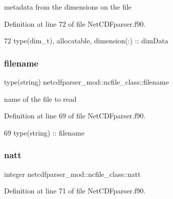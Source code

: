 metadata from the dimensions on the file 



Definition at line 72 of file Net\+C\+D\+Fparser.\+f90.


\begin{DoxyCode}
72         \textcolor{keywordtype}{type}(dim\_t), \textcolor{keywordtype}{allocatable}, \textcolor{keywordtype}{dimension(:)} :: dimData
\end{DoxyCode}
\mbox{\label{structnetcdfparser__mod_1_1ncfile__class_ae3784734e7d33f1c44284a489dc18b8e}} 
\subsubsection{\texorpdfstring{filename}{filename}}
{\footnotesize\ttfamily type(string) netcdfparser\+\_\+mod\+::ncfile\+\_\+class\+::filename\hspace{0.3cm}{\ttfamily [private]}}



name of the file to read 



Definition at line 69 of file Net\+C\+D\+Fparser.\+f90.


\begin{DoxyCode}
69         \textcolor{keywordtype}{type}(string) :: filename
\end{DoxyCode}
\mbox{\label{structnetcdfparser__mod_1_1ncfile__class_a79568f0aae456c7a278c44a767a7be11}} 
\subsubsection{\texorpdfstring{natt}{natt}}
{\footnotesize\ttfamily integer netcdfparser\+\_\+mod\+::ncfile\+\_\+class\+::natt\hspace{0.3cm}{\ttfamily [private]}}



Definition at line 71 of file Net\+C\+D\+Fparser.\+f90.

